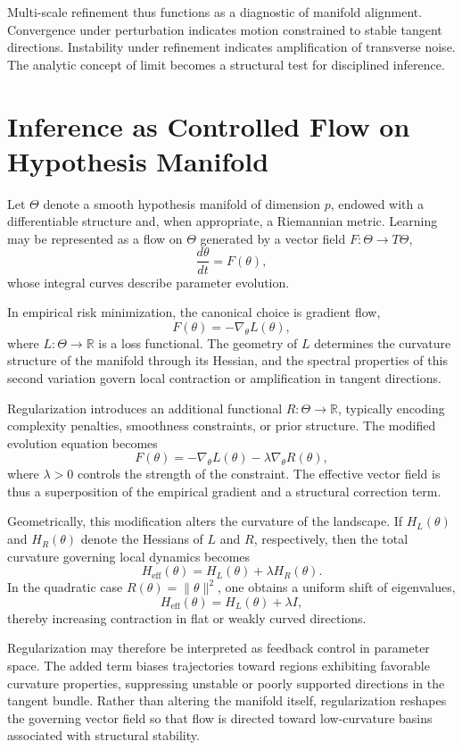 \documentclass[12pt]{book}
\begin{document}
Multi-scale refinement thus functions as a diagnostic of manifold alignment. Convergence under perturbation indicates motion constrained to stable tangent directions. Instability under refinement indicates amplification of transverse noise. The analytic concept of limit becomes a structural test for disciplined inference.

\section{Inference as Controlled Flow on Hypothesis Manifold}

Let $\Theta$ denote a smooth hypothesis manifold of dimension $p$, endowed with a differentiable structure and, when appropriate, a Riemannian metric. Learning may be represented as a flow on $\Theta$ generated by a vector field $F : \Theta \to T\Theta$,
\[
\frac{d\theta}{dt} = F(\theta),
\]
whose integral curves describe parameter evolution.

In empirical risk minimization, the canonical choice is gradient flow,
\[
F(\theta) = - \nabla_\theta L(\theta),
\]
where $L : \Theta \to \mathbb{R}$ is a loss functional. The geometry of $L$ determines the curvature structure of the manifold through its Hessian, and the spectral properties of this second variation govern local contraction or amplification in tangent directions.

Regularization introduces an additional functional $R : \Theta \to \mathbb{R}$, typically encoding complexity penalties, smoothness constraints, or prior structure. The modified evolution equation becomes
\[
F(\theta) = - \nabla_\theta L(\theta) - \lambda \nabla_\theta R(\theta),
\]
where $\lambda > 0$ controls the strength of the constraint. The effective vector field is thus a superposition of the empirical gradient and a structural correction term.

Geometrically, this modification alters the curvature of the landscape. If $H_L(\theta)$ and $H_R(\theta)$ denote the Hessians of $L$ and $R$, respectively, then the total curvature governing local dynamics becomes
\[
H_{\text{eff}}(\theta) = H_L(\theta) + \lambda H_R(\theta).
\]
In the quadratic case $R(\theta) = \|\theta\|^2$, one obtains a uniform shift of eigenvalues,
\[
H_{\text{eff}}(\theta) = H_L(\theta) + \lambda I,
\]
thereby increasing contraction in flat or weakly curved directions.

Regularization may therefore be interpreted as feedback control in parameter space. The added term biases trajectories toward regions exhibiting favorable curvature properties, suppressing unstable or poorly supported directions in the tangent bundle. Rather than altering the manifold itself, regularization reshapes the governing vector field so that flow is directed toward low-curvature basins associated with structural stability.
\end{document}
